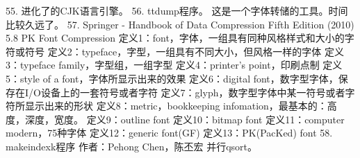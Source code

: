 %
%
%
%
55. 进化了的CJK语言引擎。
56. ttdump程序。
    这是一个字体转储的工具。时间比较久远了。
57. Springer - Handbook of Data Compression Fifth Edition (2010)
    5.8 PK Font Compression
    定义1：font，字体，一组具有同种风格样式和大小的字符或符号
    定义2：typeface，字型，一组具有不同大小，但风格一样的字体
    定义3：typeface family，字型组，一组字型
    定义4：printer's point，印刷点制
    定义5：style of a font，字体所显示出来的效果
    定义6：digital font，数字型字体，保存在I/O设备上的一套符号或者字符
    定义7：glyph，数字型字体中某一符号或者字符所显示出来的形状
    定义8：metric，bookkeeping infomation，最基本的：高度，深度，宽度。
    定义9：outline font
    定义10：bitmap font
    定义11：computer modern，75种字体
    定义12：generic font(GF)
    定义13：PK(PacKed) font
58. makeindexk程序
    作者：Pehong Chen，陈丕宏
    并行qsort。
